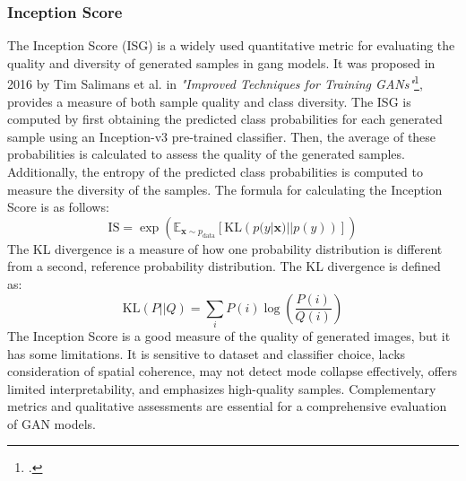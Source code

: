\subsubsection{Inception Score}
\label{subsubsec:inception-score}
The Inception Score (\gls{ISG}\glsfirstoccur) is a widely used quantitative metric for evaluating the quality and diversity of generated samples in \gls{gang} models.
It was proposed in 2016 by Tim Salimans et al. in \emph{"Improved Techniques for Training GANs"}\footcite{paper:salimans2016improved}, provides a measure of both sample quality and class diversity. 
The \gls{ISG} is computed by first obtaining the predicted class probabilities for each generated sample using an Inception-v3 pre-trained classifier. 
Then, the average of these probabilities is calculated to assess the quality of the generated samples. 
Additionally, the entropy of the predicted class probabilities is computed to measure the diversity of the samples. 
The formula for calculating the Inception Score is as follows:
\begin{equation}
    \label{eq:inception-score}
    \text{IS} = \exp \left( \mathbb{E}_{\mathbf{x} \sim p_{\text{data}}} \left[ \text{KL} \left( p(y|\mathbf{x}) || p(y) \right) \right] \right)
\end{equation}
The KL divergence is a measure of how one probability distribution is different from a second, reference probability distribution.
The KL divergence is defined as:
\begin{equation}
    \label{eq:kl-divergence}
    \text{KL}(P || Q) = \sum_{i} P(i) \log \left(\frac{P(i)}{Q(i)}\right)
\end{equation}
The Inception Score is a good measure of the quality of generated images, but it has some limitations.
It is sensitive to dataset and classifier choice, lacks consideration of spatial coherence, may not detect mode collapse effectively, offers limited interpretability, and emphasizes high-quality samples. 
Complementary metrics and qualitative assessments are essential for a comprehensive evaluation of GAN models.
